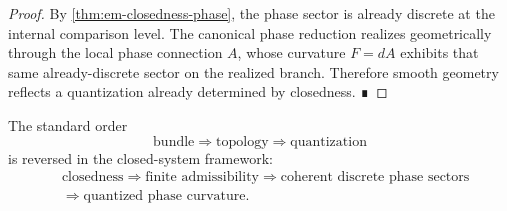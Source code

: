 \begin{proof}
	By \cref{thm:em-closedness-phase}, the phase sector is already discrete
	at the internal comparison level.
	The canonical phase reduction realizes geometrically through the local
	phase connection \(A\), whose curvature \(F=dA\) exhibits that same
	already-discrete sector on the realized branch.
	Therefore smooth geometry reflects a quantization already determined by
	closedness. ∎
\end{proof}
\begin{remark}
	The standard order
	\[
		\text{bundle}
		\Longrightarrow
		\text{topology}
		\Longrightarrow
		\text{quantization}
	\]
	is reversed in the closed-system framework:
	\[
		\begin{aligned}
			 & \text{closedness}
			\Longrightarrow
			\text{finite admissibility}
			\Longrightarrow
			\text{coherent discrete phase sectors}
			\\
			 & \Longrightarrow
			\text{quantized phase curvature}.
		\end{aligned}
	\]
\end{remark}
